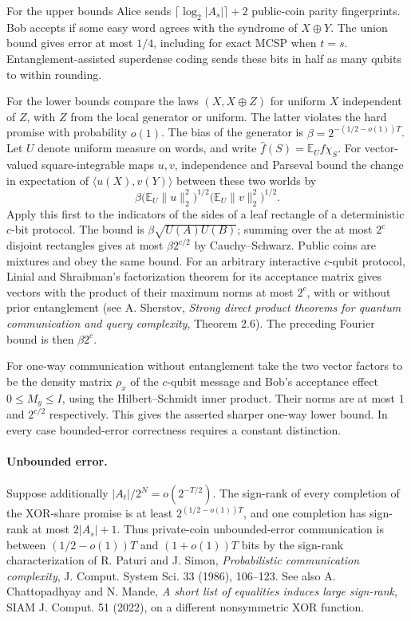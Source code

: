 For the upper bounds Alice sends $\lceil\log_2|A_s|\rceil+2$ public-coin parity fingerprints. Bob accepts if some easy word agrees with the syndrome of $X\oplus Y$. The union bound gives error at most $1/4$, including for exact MCSP when $t=s$. Entanglement-assisted superdense coding sends these bits in half as many qubits to within rounding.

For the lower bounds compare the laws $(X,X\oplus Z)$ for uniform $X$ independent of $Z$, with $Z$ from the local generator or uniform. The latter violates the hard promise with probability $o(1)$. The bias of the generator is $\beta=2^{-(1/2-o(1))T}$. Let $U$ denote uniform measure on words, and write $\widehat f(S)=\mathbb E_U f\chi_S$. For vector-valued square-integrable maps $u,v$, independence and Parseval bound the change in expectation of $\langle u(X),v(Y)\rangle$ between these two worlds by
\[
 \beta\Big(\mathbb E_U\|u\|_2^2\Big)^{1/2}
       \Big(\mathbb E_U\|v\|_2^2\Big)^{1/2}.
\]
Apply this first to the indicators of the sides of a leaf rectangle of a deterministic $c$-bit protocol. The bound is $\beta\sqrt{U(A)U(B)}$; summing over the at most $2^c$ disjoint rectangles gives at most $\beta2^{c/2}$ by Cauchy--Schwarz. Public coins are mixtures and obey the same bound. For an arbitrary interactive $c$-qubit protocol, Linial and Shraibman's factorization theorem for its acceptance matrix gives vectors with the product of their maximum norms at most $2^c$, with or without prior entanglement (see A. Sherstov, \emph{Strong direct product theorems for quantum communication and query complexity}, Theorem 2.6). The preceding Fourier bound is then $\beta2^c$.

For one-way communication without entanglement take the two vector factors to be the density matrix $\rho_x$ of the $c$-qubit message and Bob's acceptance effect $0\le M_y\le I$, using the Hilbert--Schmidt inner product. Their norms are at most $1$ and $2^{c/2}$ respectively. This gives the asserted sharper one-way lower bound. In every case bounded-error correctness requires a constant distinction.

\paragraph{Unbounded error.}
Suppose additionally $|A_t|/2^N=o(2^{-T/2})$. The sign-rank of every completion of the XOR-share promise is at least $2^{(1/2-o(1))T}$, and one completion has sign-rank at most $2|A_s|+1$. Thus private-coin unbounded-error communication is between $(1/2-o(1))T$ and $(1+o(1))T$ bits by the sign-rank characterization of R. Paturi and J. Simon, \emph{Probabilistic communication complexity}, J. Comput. System Sci. 33 (1986), 106--123. See also A. Chattopadhyay and N. Mande, \emph{A short list of equalities induces large sign-rank}, SIAM J. Comput. 51 (2022), on a different nonsymmetric XOR function.

